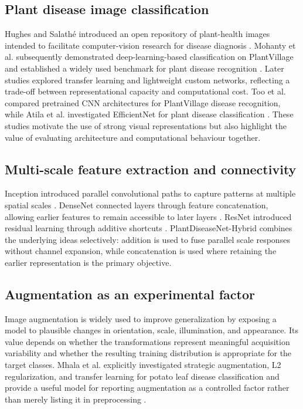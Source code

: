 \documentclass[a4paper,fleqn]{cas-dc}
\begin{document}
\subsection{Plant disease image classification}
Hughes and Salathé introduced an open repository of plant-health images intended to facilitate computer-vision research for disease diagnosis \citep{hughes2015}. Mohanty et al. subsequently demonstrated deep-learning-based classification on PlantVillage and established a widely used benchmark for plant disease recognition \citep{mohanty2016}. Later studies explored transfer learning and lightweight custom networks, reflecting a trade-off between representational capacity and computational cost. Too et al. compared pretrained CNN architectures for PlantVillage disease recognition, while Atila et al. investigated EfficientNet for plant disease classification \citep{too2019,atila2021}. These studies motivate the use of strong visual representations but also highlight the value of evaluating architecture and computational behaviour together.

\subsection{Multi-scale feature extraction and connectivity}
Inception introduced parallel convolutional paths to capture patterns at multiple spatial scales \citep{szegedy2015}. DenseNet connected layers through feature concatenation, allowing earlier features to remain accessible to later layers \citep{huang2017}. ResNet introduced residual learning through additive shortcuts \citep{he2016}. PlantDiseaseNet-Hybrid combines the underlying ideas selectively: addition is used to fuse parallel scale responses without channel expansion, while concatenation is used where retaining the earlier representation is the primary objective.

\subsection{Augmentation as an experimental factor}
Image augmentation is widely used to improve generalization by exposing a model to plausible changes in orientation, scale, illumination, and appearance. Its value depends on whether the transformations represent meaningful acquisition variability and whether the resulting training distribution is appropriate for the target classes. Mhala et al. explicitly investigated strategic augmentation, L2 regularization, and transfer learning for potato leaf disease classification and provide a useful model for reporting augmentation as a controlled factor rather than merely listing it in preprocessing \citep{mhalap2025}.
\end{document}
